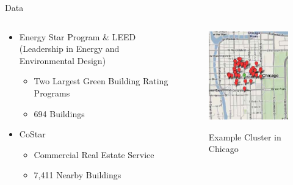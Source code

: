 \documentclass[11pt]{beamer}
\begin{document}
\begin{frame}{Data}
\begin{columns}
\begin{column}{0.6\linewidth}
\begin{itemize}
	\item Energy Star Program \& LEED (Leadership in Energy and Environmental Design)
	\begin{itemize}
		\item Two Largest Green Building Rating Programs
		\item 694 Buildings
	\end{itemize}
	\vspace{1.5cm}
	\item CoStar
	\begin{itemize}
		\item Commercial Real Estate Service
		\item 7,411 Nearby Buildings
	\end{itemize}
\end{itemize}
\end{column}
\begin{column}{0.4\linewidth}
\centering
\begin{figure}
\caption{Example Cluster in Chicago}
\includegraphics[width=\textwidth]{she-cago.png}
\scriptsize \citep{eichholtz2011rents}
\end{figure}
\end{column}
\end{columns}
\end{frame}
\end{document}
